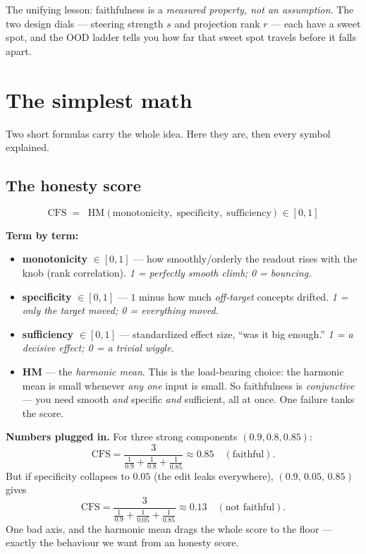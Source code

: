 \documentclass[12pt]{article}
\begin{document}
The unifying lesson: faithfulness is a \emph{measured property, not an assumption}. The two design dials --- steering strength $s$ and projection rank $r$ --- each have a sweet spot, and the OOD ladder tells you how far that sweet spot travels before it falls apart.

\section{The simplest math}

Two short formulas carry the whole idea. Here they are, then every symbol explained.

\subsection*{The honesty score}
\begin{equation*}
\boxed{\;\text{CFS} \;=\; \operatorname{HM}\big(\,\text{monotonicity},\;\text{specificity},\;\text{sufficiency}\,\big)\;\in[0,1]\;}
\end{equation*}

\textbf{Term by term:}
\begin{itemize}[leftmargin=1.4em, itemsep=3pt]
  \item \textbf{monotonicity} $\in[0,1]$ --- how smoothly/orderly the readout rises with the knob (rank correlation). \emph{1 = perfectly smooth climb; 0 = bouncing.}
  \item \textbf{specificity} $\in[0,1]$ --- $1$ minus how much \emph{off-target} concepts drifted. \emph{1 = only the target moved; 0 = everything moved.}
  \item \textbf{sufficiency} $\in[0,1]$ --- standardized effect size, ``was it big enough.'' \emph{1 = a decisive effect; 0 = a trivial wiggle.}
  \item \textbf{HM} --- the \emph{harmonic mean}. This is the load-bearing choice: the harmonic mean is small whenever \emph{any one} input is small. So faithfulness is \emph{conjunctive} --- you need smooth \emph{and} specific \emph{and} sufficient, all at once. One failure tanks the score.
\end{itemize}

\textbf{Numbers plugged in.} For three strong components $(0.9, 0.8, 0.85)$:
\[
\text{CFS}=\frac{3}{\frac{1}{0.9}+\frac{1}{0.8}+\frac{1}{0.85}}\approx 0.85 \quad(\text{faithful}).
\]
But if specificity collapses to $0.05$ (the edit leaks everywhere), $(0.9,\,0.05,\,0.85)$ gives
\[
\text{CFS}=\frac{3}{\frac{1}{0.9}+\frac{1}{0.05}+\frac{1}{0.85}}\approx 0.13 \quad(\text{not faithful}).
\]
One bad axis, and the harmonic mean drags the whole score to the floor --- exactly the behaviour we want from an honesty score.
\end{document}

